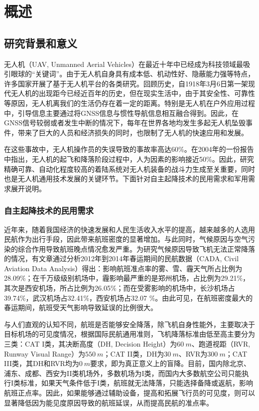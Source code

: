 \chapter{概述}


\section{研究背景和意义}
无人机（UAV, Unmanned Aerial Vehicles）在最近十年中已经成为科技领域最吸引眼球的“关键词”。由于无人机自身具有成本低、机动性好、隐蔽能力强等特点，许多国家开展了基于无人机平台的各类研究。回顾历史，自1918年3月6日第一架现代无人机的出现距今已经近百年的历史，但在现实生活中，由于其安全性、可靠性等原因，无人机离我们的生活仍存在着一定的距离。特别是无人机在户外应用过程中，引导信息主要通过将GNSS信息与惯性导航信息相互融合得到。因此，在GNSS信号较弱或者发生中断的情况下，每年在世界各地均发生多起无人机坠毁事件，带来了巨大的人员和经济损失的同时，也限制了无人机的快速应用和发展。

在这些事故中，无人机操作员的失误导致的事故率高达60\%\cite{arrabito2010human}。在2004年的一份报告中指出\cite{williams2004summary}，无人机的起飞和降落阶段过程中，人为因素的影响接近50\%。因此，研究精确可靠、自动化程度较高的着陆系统对无人机装备的战斗力生成至关重要，同时也是无人机通用技术发展的关键环节。下面针对自主起降技术的民用需求和军用需求展开说明。

\subsection{自主起降技术的民用需求}
近年来，随着我国经济的快速发展和人民生活收入水平的提高，越来越多的人选用民航作为出行手段，因此带来航班密度的显著增加。与此同时，气候原因与空气污染的综合作用导致航班晚点情况愈发严重。为研究气候原因导致飞机无法正常降落的情况，有文章\cite{BigDataLanding}通过分析2012年到2014年春运期间的民航数据（CADA, Civil Aviation Data Analysis）得出：影响航班准点率的雾、雪、霾天气所占比例为28.09\%；在千万级级别机场中，霾影响最严重的是郑州机场，占比例为29.21\%，其次是西安机场，所占比例为26.05\%；而在受雾影响的机场中，长沙机场占39.74\%，武汉机场占32.41\%，西安机场占32.07 \%。由此可见，在航班密度最大的春运期间，航班受天气影响导致延误的比例很大。

与人们直观的认知不同，航班是否能够安全降落，除飞机自身性能外，主要取决于目标机场的可见度情况，根据国际民航通用准则，飞机降落标准由低至高主要分为三类：CAT I类，其决断高度（DH, Decision Height）为$60\ m$、跑道视距（RVR, Runway Visual Range）为$550\ m$；CAT II类，DH为$30\ m$、RVR为$300\ m$；CAT III类，其DH和RVR均为$0\ m$要求，即为真正意义上的盲降。目前，国内除北京、浦东、成都、西安为II类机场外，多数机场为I类，而国内大多数航空公司只能执行I类标准，如果天气条件低于I类，航班就无法降落，只能选择备降或返航，影响航班正点率。因此，如果能够通过辅助设备，提高和拓展飞行员的可见度，则可以显著降低因为能见度原因导致的航班延误，从而提高民航的准点率。

